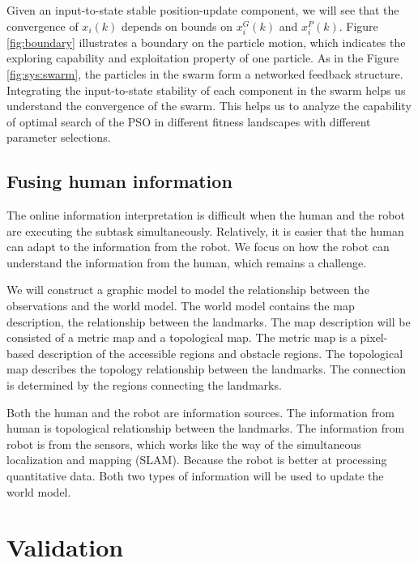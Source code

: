 \documentclass[phd]{byuprop}
\begin{document}
Given an input-to-state stable position-update component, we will see that the convergence of $ x_{i}(k) $ depends on bounds on $ x^{G}_{i}(k) $ and $ x^{P}_{i}(k) $.
Figure \ref{fig:boundary} illustrates a boundary on the particle motion, which indicates the exploring capability and exploitation property of one particle.
As in the Figure \ref{fig:sys:swarm}, the particles in the swarm form a networked feedback structure.
Integrating the input-to-state stability of each component in the swarm helps us understand the convergence of the swarm.
This helps us to analyze the capability of optimal search of the PSO in different fitness landscapes with different parameter selections.

\subsection{Fusing human information}

The online information interpretation is difficult when the human and the robot are executing the subtask simultaneously.
Relatively, it is easier that the human can adapt to the information from the robot.
We focus on how the robot can understand the information from the human, which remains a challenge.

We will construct a graphic model to model the relationship between the observations and the world model.
The world model contains the map description, the relationship between the landmarks.
The map description will be consisted of a metric map and a topological map.
The metric map is a pixel-based description of the accessible regions and obstacle regions.
The topological map describes the topology relationship between the landmarks.
The connection is determined by the regions connecting the landmarks.

Both the human and the robot are information sources.
The information from human is topological relationship between the landmarks.
The information from robot is from the sensors, which works like the way of the simultaneous localization and mapping (SLAM).
Because the robot is better at processing quantitative data.
Both two types of information will be used to update the world model.

\section{Validation}
\end{document}
